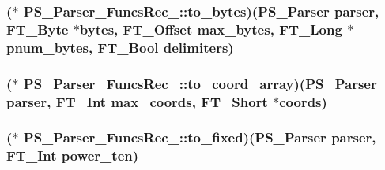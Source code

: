 \hypertarget{struct_p_s___parser___funcs_rec___abbda6afe648361ec1efa535fc853ce54}{
\subsubsection[{to\-\_\-bytes}]{($\ast$ P\-S\-\_\-\-Parser\-\_\-\-Funcs\-Rec\-\_\-\-::to\-\_\-bytes)({\bf P\-S\-\_\-\-Parser} parser, {\bf F\-T\-\_\-\-Byte} $\ast$bytes, {\bf F\-T\-\_\-\-Offset} max\-\_\-bytes, {\bf F\-T\-\_\-\-Long} $\ast$pnum\-\_\-bytes, {\bf F\-T\-\_\-\-Bool} delimiters)}}\label{struct_p_s___parser___funcs_rec___abbda6afe648361ec1efa535fc853ce54}
\hypertarget{struct_p_s___parser___funcs_rec___a11da5ac33187bc7b67696a9d24f3d239}{
\subsubsection[{to\-\_\-coord\-\_\-array}]{($\ast$ P\-S\-\_\-\-Parser\-\_\-\-Funcs\-Rec\-\_\-\-::to\-\_\-coord\-\_\-array)({\bf P\-S\-\_\-\-Parser} parser, {\bf F\-T\-\_\-\-Int} max\-\_\-coords, {\bf F\-T\-\_\-\-Short} $\ast${\bf coords})}}\label{struct_p_s___parser___funcs_rec___a11da5ac33187bc7b67696a9d24f3d239}
\hypertarget{struct_p_s___parser___funcs_rec___a7a67e9c9b8fc0e0aedb37476f107e835}{
\subsubsection[{to\-\_\-fixed}]{($\ast$ P\-S\-\_\-\-Parser\-\_\-\-Funcs\-Rec\-\_\-\-::to\-\_\-fixed)({\bf P\-S\-\_\-\-Parser} parser, {\bf F\-T\-\_\-\-Int} power\-\_\-ten)}}\label{struct_p_s___parser___funcs_rec___a7a67e9c9b8fc0e0aedb37476f107e835}
